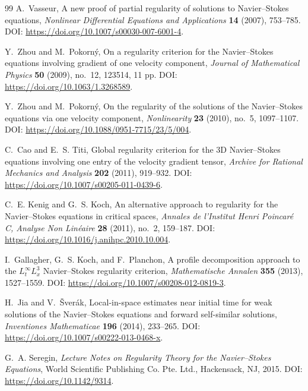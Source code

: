 \documentclass[11pt]{article}
\numberwithin{equation}{section}
\theoremstyle{plain}
\theoremstyle{definition}
\theoremstyle{remark}
\begin{document}
\begin{thebibliography}{99}
A.~Vasseur,
\newblock A new proof of partial regularity of solutions to Navier--Stokes equations,
\newblock \emph{Nonlinear Differential Equations and Applications} \textbf{14} (2007), 753--785.
\newblock DOI: \url{https://doi.org/10.1007/s00030-007-6001-4}.

Y.~Zhou and M.~Pokorn\'y,
\newblock On a regularity criterion for the Navier--Stokes equations involving gradient of one velocity component,
\newblock \emph{Journal of Mathematical Physics} \textbf{50} (2009), no.~12, 123514, 11 pp.
\newblock DOI: \url{https://doi.org/10.1063/1.3268589}.

Y.~Zhou and M.~Pokorn\'y,
\newblock On the regularity of the solutions of the Navier--Stokes equations via one velocity component,
\newblock \emph{Nonlinearity} \textbf{23} (2010), no.~5, 1097--1107.
\newblock DOI: \url{https://doi.org/10.1088/0951-7715/23/5/004}.

C.~Cao and E.~S. Titi,
\newblock Global regularity criterion for the 3D Navier--Stokes equations involving one entry of the velocity gradient tensor,
\newblock \emph{Archive for Rational Mechanics and Analysis} \textbf{202} (2011), 919--932.
\newblock DOI: \url{https://doi.org/10.1007/s00205-011-0439-6}.

C.~E. Kenig and G.~S. Koch,
\newblock An alternative approach to regularity for the Navier--Stokes equations in critical spaces,
\newblock \emph{Annales de l'Institut Henri Poincar\'e C, Analyse Non Lin\'eaire} \textbf{28} (2011), no.~2, 159--187.
\newblock DOI: \url{https://doi.org/10.1016/j.anihpc.2010.10.004}.

I.~Gallagher, G.~S. Koch, and F.~Planchon,
\newblock A profile decomposition approach to the \(L^\infty_t L^3_x\) Navier--Stokes regularity criterion,
\newblock \emph{Mathematische Annalen} \textbf{355} (2013), 1527--1559.
\newblock DOI: \url{https://doi.org/10.1007/s00208-012-0819-3}.

H.~Jia and V.~\v{S}ver\'ak,
\newblock Local-in-space estimates near initial time for weak solutions of the Navier--Stokes equations and forward self-similar solutions,
\newblock \emph{Inventiones Mathematicae} \textbf{196} (2014), 233--265.
\newblock DOI: \url{https://doi.org/10.1007/s00222-013-0468-x}.

G.~A. Seregin,
\newblock \emph{Lecture Notes on Regularity Theory for the Navier--Stokes Equations},
\newblock World Scientific Publishing Co. Pte. Ltd., Hackensack, NJ, 2015.
\newblock DOI: \url{https://doi.org/10.1142/9314}.


\end{thebibliography}
\end{document}
